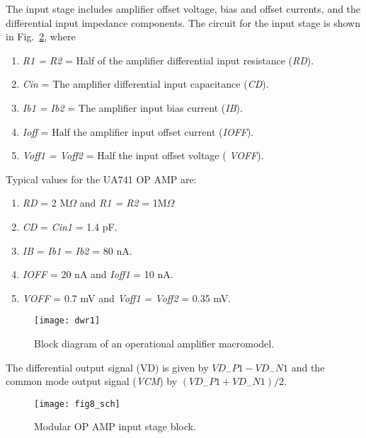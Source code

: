 The input stage includes amplifier offset voltage, bias and offset currents, and the differential input impedance components. The circuit for the input stage is shown in Fig.~\ref{fig:opamp8}, where
\begin{enumerate}
\item \textit{R1   = R2} = Half of the amplifier differential input resistance (\textit{RD}).
\item \textit{Cin}   = The amplifier differential input capacitance (\textit{CD}).
\item \textit{Ib1    = Ib2} = The amplifier input bias current (\textit{IB}).
\item \textit{Ioff}  = Half the amplifier input offset current (\textit{IOFF}).
\item \textit{Voff1 = Voff2} = Half the input offset voltage ( \textit{VOFF}).
\end{enumerate}

Typical values for the UA741 OP AMP are:

\begin{enumerate}
\item \textit{RD} = 2 M$\Omega$ and \textit{R1 = R2} = 1M$\Omega$
\item \textit{CD} = \textit{Cin1} = 1.4 pF.
\item \textit{IB} = \textit{Ib1} = \textit{Ib2 }= 80 nA.
\item \textit{IOFF} = 20 nA and \textit{Ioff1} = 10 nA.
\item \textit{VOFF} = 0.7 mV and \textit{Voff1 = Voff2} = 0.35 mV.
\end{enumerate}

\FloatBarrier
\begin{figure}
  \centering
  \texttt{[image: dwr1]}
  \caption{Block diagram of an operational amplifier macromodel.} 
  \label{fig:opamp7}
\end{figure} 
\FloatBarrier


The differential output signal (VD) is given by $VD_{-}P1 - VD_{-}N1$ and the common mode output signal (\textit{VCM}) by $(VD_{-}P1 + VD_{-}N1)/2$.
\FloatBarrier
\begin{figure}
  \centering
  \texttt{[image: fig8\_sch]}
  \caption{Modular OP AMP input stage block.}
  \label{fig:opamp8}
\end{figure}
\FloatBarrier

